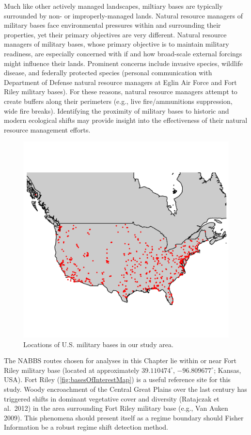 \documentclass[12pt,twoside,openany]{reedthesis}
\begin{document}
Much like other actively managed landscapes, miltiary bases are typically surrounded by non- or improperly-managed lands. Natural resource managers of military bases face environmental pressures within and surrounding their properties, yet their primary objectives are very different. Natural resource managers of military bases, whose primary objective is to maintain military readiness, are especially concerned with if and how broad-scale external forcings might influence their lands. Prominent concerns include invasive species, wildlife disease, and federally protected species (personal communication with Department of Defense natural resource managers at Eglin Air Force and Fort Riley military bases). For these reasons, natural resource managers attempt to create buffers along their perimeters (e.g., live fire/ammunitions suppression, wide fire breaks). Identifying the proximity of military bases to historic and modern ecological shifts may provide insight into the effectiveness of their natural resource management efforts.
\begin{figure}

{\centering \includegraphics[width=0.85\linewidth]{./chapterFiles/fisherSpatial/figures/figsCalledInDiss/milBases} 

}

\caption{Locations of U.S. military bases in our study area.}\label{fig:milBases}
\end{figure}
The NABBS routes chosen for analyses in this Chapter lie within or near Fort Riley military base (located at approximately \(39.110474^{\circ}\), \(-96.809677^{\circ}\); Kansas, USA). Fort Riley (\ref{fig:basesOfInterestMap}) is a useful reference site for this study. Woody encroachment of the Central Great Plains over the last century has triggered shifts in dominant vegetative cover and diversity (Ratajczak et al.~2012) in the area surrounding Fort Riley military base (e.g., Van Auken 2009). This phenomena should present itself as a regime boundary should Fisher Information be a robust regime shift detection method.
\end{document}
